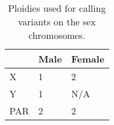 \begin{table}[h]
\centering
\begin{tabular}{l|l|l|}
\cline{2-3}
\rowcolor[HTML]{FFFFFF} 
                          & Male & Female \\ \hline
\multicolumn{1}{|l|}{X}   & 1    & 2      \\ \hline
\multicolumn{1}{|l|}{Y}   & 1    & N/A    \\ \hline
\multicolumn{1}{|l|}{PAR} & 2    & 2      \\ \hline 
\end{tabular}
\caption{Ploidies used for calling variants on the sex chromosomes.}
\label{table:XYcalling}
\end{table}